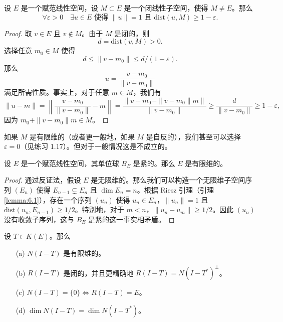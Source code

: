\begin{lemma}[Riesz 引理]\label{lemma:6.1}
设 \(E\) 是一个赋范线性空间，设 \(M \subset E\) 是一个闭线性子空间，使得 \(M \ne E\)。那么
\[
\forall \varepsilon > 0 \quad \exists u \in E \text{ 使得 } \|u\| = 1 \text{ 且 } \mathrm{dist}(u, M) \ge 1 - \varepsilon.
\]
\end{lemma}
\begin{proof}
取 \(v \in E\) 且 \(v \notin M\)。由于 \(M\) 是闭的，则
\[
d = \mathrm{dist}(v, M) > 0.
\]
选择任意 \(m_0 \in M\) 使得
\[
d \le \|v - m_0\| \le d / (1 - \varepsilon).
\]
那么
\[
u = \frac{v - m_0}{\|v - m_0\|}
\]
满足所需性质。事实上，对于任意 \(m \in M\)，我们有
\[
\|u - m\| = \left\| \frac{v - m_0}{\|v - m_0\|} - m \right\| = \frac{\|v - m_0 - \|v - m_0\|m\|}{\|v - m_0\|} \ge \frac{d}{\|v - m_0\|} \ge 1 - \varepsilon,
\]
因为 \(m_0 + \|v - m_0\|m \in M\)。
\end{proof}

\begin{remark}\label{remark:6.3}
如果 \(M\) 是有限维的（或者更一般地，如果 \(M\) 是自反的），我们甚至可以选择 \(\varepsilon = 0\)（见练习 1.17）。但对于一般情况这是不成立的。
\end{remark}

\begin{theorem}[Riesz]\label{theorem:6.5}
设 \(E\) 是一个赋范线性空间，其单位球 \(B_E\) 是紧的。那么 \(E\) 是有限维的。
\end{theorem}
\begin{proof}
通过反证法，假设 \(E\) 是无限维的。那么我们可以构造一个无限维子空间序列 \((E_n)\) 使得 \(E_{n-1} \subsetneq E_n\) 且 \(\dim E_n = n\)。根据 Riesz 引理（引理 \ref{lemma:6.1}），存在一个序列 \((u_n)\) 使得 \(u_n \in E_n\)，\(\|u_n\| = 1\) 且 \(\mathrm{dist}(u_n, E_{n-1}) \ge 1/2\)。特别地，对于 \(m < n\)，\(\|u_n - u_m\| \ge 1/2\)。因此 \((u_n)\) 没有收敛子序列，这与 \(B_E\) 是紧的这一事实相矛盾。
\end{proof}

\begin{theorem}\label{theorem:6.6}
设 \(T \in K(E)\)。那么
\begin{itemize}
    \item[(a)] \(N(I-T)\) 是有限维的。
    \item[(b)] \(R(I-T)\) 是闭的，并且更精确地 \(R(I-T) = N(I-T^*)^\perp\)。
    \item[(c)] \(N(I-T) = \{0\} \iff R(I-T) = E\)。
    \item[(d)] \(\dim N(I-T) = \dim N(I-T^*)\)。
\end{itemize}
\end{theorem}

